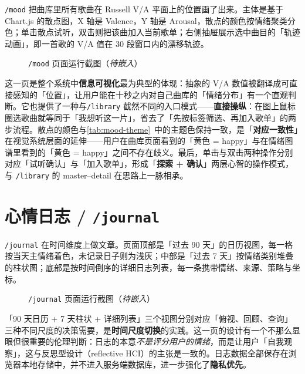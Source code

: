 \texttt{/mood} 把曲库里所有歌曲在 Russell V/A 平面上的位置画了出来。主体是基于 Chart.js 的散点图，X 轴是 Valence，Y 轴是 Arousal，散点的颜色按情绪聚类分色；单击散点试听，双击则把该曲加入当前歌单；右侧抽屉展示选中曲目的「轨迹动画」，即一首歌的 V/A 值在 30 段窗口内的漂移轨迹。

\begin{figure}[!htb]
  \centering
  \fbox{\rule{0pt}{6cm}\hspace{12.5cm}}
  \caption{\texttt{/mood} 页面运行截图（\textit{待嵌入}）}\label{fig:mood}
\end{figure}

这一页是整个系统中\textbf{信息可视化}最为典型的体现：抽象的 V/A 数值被翻译成可直接感知的「位置」，让用户能在十秒之内对自己曲库的「情绪分布」有一个直观判断。它也提供了一种与\texttt{/library} 截然不同的入口模式——\textbf{直接操纵}：在图上鼠标圈选歌曲就等同于「我想听这一片」，省去了「先按标签筛选、再加入歌单」的两步流程。散点的颜色与\cref{tab:mood-theme}~中的主题色保持一致，是「\textbf{对应一致性}」在视觉系统层面的延伸——用户在曲库页面看到的「黄色 = happy」与在情绪图谱里看到的「黄色 = happy」之间不存在歧义。最后，单击与双击两种操作分别对应「试听确认」与「加入歌单」，形成「\textbf{探索 + 确认}」两层心智的操作模式，与 \texttt{/library} 的 master--detail 在思路上一脉相承。

\section{心情日志 / \texttt{/journal}}

\texttt{/journal} 在时间维度上做文章。页面顶部是「过去 90 天」的日历视图，每一格按当天主情绪着色，未记录日子则为浅灰；中部是「过去 7 天」按情绪类别堆叠的柱状图；底部是按时间倒序的详细日志列表，每一条携带情绪、来源、策略与坐标。

\begin{figure}[!htb]
  \centering
  \fbox{\rule{0pt}{6cm}\hspace{12.5cm}}
  \caption{\texttt{/journal} 页面运行截图（\textit{待嵌入}）}\label{fig:journal}
\end{figure}

「90 天日历 + 7 天柱状 + 详细列表」三个视图分别对应「俯视、回顾、查询」三种不同尺度的决策需要，是\textbf{时间尺度切换}的实践。这一页的设计有一个不那么显眼但很重要的伦理判断：日志的本意\emph{不是评分用户的情绪}，而是让用户「自我观察」，这与反思型设计（reflective HCI）的主张是一致的。日志数据全部保存在浏览器本地存储中，并不进入服务端数据库，进一步强化了\textbf{隐私优先}。


